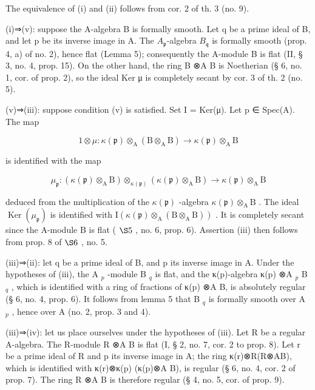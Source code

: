 The equivalence of (i) and (ii) follows from cor. 2 of th. 3 (no. 9).

(i)⇒(v): suppose the A-algebra B is formally smooth. Let q be a prime ideal of B, and let p be its inverse image in A. The \(A_{\mathfrak{p}}\)-algebra \(B_{\mathfrak{q}}\) is formally smooth (prop. 4, a) of no. 2), hence flat (Lemma 5); consequently the A-module B is flat (II, § 3, no. 4, prop. 15). On the other hand, the ring B ⊗A B is Noetherian (§ 6, no. 1, cor. of prop. 2), so the ideal Ker μ is completely secant by cor. 3 of th. 2 (no. 5).

(v)⇒(iii): suppose condition (v) is satisfied. Set I = Ker(μ). Let p ∈ Spec(A). The map

\[
1 \otimes \mu : \kappa (\mathfrak {p}) \otimes_ {\mathrm{A}} (\mathrm{B} \otimes_ {\mathrm{A}} \mathrm{B}) \rightarrow \kappa (\mathfrak {p}) \otimes_ {\mathrm{A}} \mathrm{B}
\]

is identified with the map

\[
\mu_ {\mathfrak {p}}: (\kappa (\mathfrak {p}) \otimes_ {\mathrm{A}} \mathrm{B}) \otimes_ {\kappa (\mathfrak {p})} (\kappa (\mathfrak {p}) \otimes_ {\mathrm{A}} \mathrm{B}) \rightarrow \kappa (\mathfrak {p}) \otimes_ {\mathrm{A}} \mathrm{B}
\]

deduced from the multiplication of the \(\kappa(\mathfrak{p})\) -algebra \(\kappa(\mathfrak{p})\otimes_{\mathrm{A}}\mathrm{B}\) . The ideal \(\operatorname{Ker}(\mu_{\mathfrak{p}})\) is identified with \(\mathrm{I}(\kappa(\mathfrak{p})\otimes_{\mathrm{A}}(\mathrm{B}\otimes_{\mathrm{A}}\mathrm{B}))\) . It is completely secant since the A-module B is flat ( \(\S 5\) , no. 6, prop. 6). Assertion (iii) then follows from prop. 8 of \(\S 6\) , no. 5.

(iii)⇒(ii): let q be a prime ideal of B, and p its inverse image in A. Under the hypotheses of (iii), the A \(_{p}\) -module B \(_{q}\) is flat, and the κ(p)-algebra κ(p) ⊗A \(_{p}\) B \(_{q}\) , which is identified with a ring of fractions of κ(p) ⊗A B, is absolutely regular (§ 6, no. 4, prop. 6). It follows from lemma 5 that B \(_{q}\) is formally smooth over A \(_{p}\) , hence over A (no. 2, prop. 3 and 4).

(iii)⇒(iv): let us place ourselves under the hypotheses of (iii). Let R be a regular A-algebra. The R-module R ⊗A B is flat (I, § 2, no. 7, cor. 2 to prop. 8). Let r be a prime ideal of R and p its inverse image in A; the ring κ(r)⊗R(R⊗AB), which is identified with κ(r)⊗κ(p) (κ(p)⊗A B), is regular (§ 6, no. 4, cor. 2 of prop. 7). The ring R ⊗A B is therefore regular (§ 4, no. 5, cor. of prop. 9).

